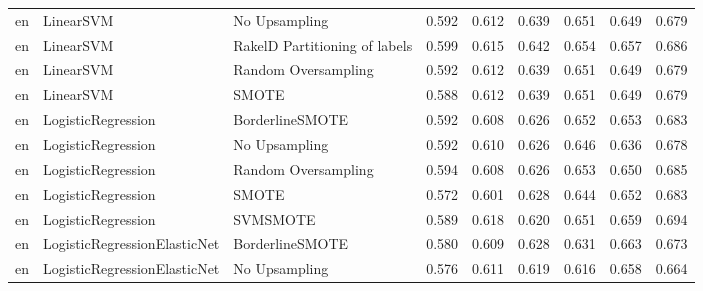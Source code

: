 \begin{tabular}{lllllllll}
      en &                       LinearSVM &                 No Upsampling & 0.592 &                     0.612 &                 0.639 &                  0.651 &                                   0.649 &     0.679 \\
      en &                       LinearSVM & RakelD Partitioning of labels & 0.599 &                     0.615 &                 0.642 &                  0.654 &                                   0.657 &     0.686 \\
      en &                       LinearSVM &           Random Oversampling & 0.592 &                     0.612 &                 0.639 &                  0.651 &                                   0.649 &     0.679 \\
      en &                       LinearSVM &                         SMOTE & 0.588 &                     0.612 &                 0.639 &                  0.651 &                                   0.649 &     0.679 \\
      en &              LogisticRegression &               BorderlineSMOTE & 0.592 &                     0.608 &                 0.626 &                  0.652 &                                   0.653 &     0.683 \\
      en &              LogisticRegression &                 No Upsampling & 0.592 &                     0.610 &                 0.626 &                  0.646 &                                   0.636 &     0.678 \\
      en &              LogisticRegression &           Random Oversampling & 0.594 &                     0.608 &                 0.626 &                  0.653 &                                   0.650 &     0.685 \\
      en &              LogisticRegression &                         SMOTE & 0.572 &                     0.601 &                 0.628 &                  0.644 &                                   0.652 &     0.683 \\
      en &              LogisticRegression &                      SVMSMOTE & 0.589 &                     0.618 &                 0.620 &                  0.651 &                                   0.659 &     0.694 \\
      en &    LogisticRegressionElasticNet &               BorderlineSMOTE & 0.580 &                     0.609 &                 0.628 &                  0.631 &                                   0.663 &     0.673 \\
      en &    LogisticRegressionElasticNet &                 No Upsampling & 0.576 &                     0.611 &                 0.619 &                  0.616 &                                   0.658 &     0.664 \\

\end{tabular}

